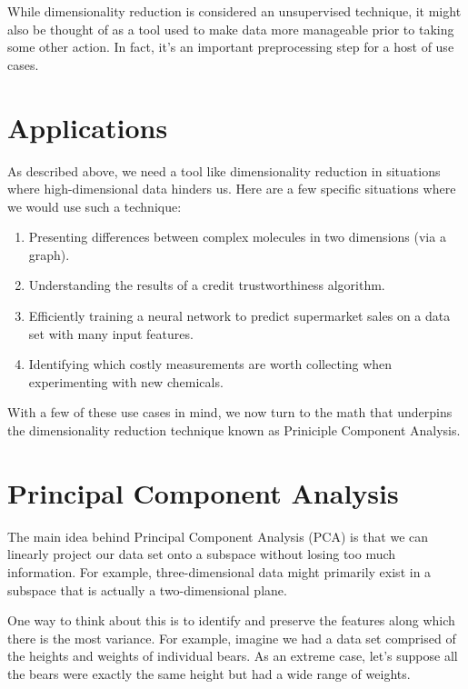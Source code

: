 While dimensionality reduction is considered an unsupervised technique, it might also be thought of as a tool used to make data more manageable prior to taking some other action. In fact, it's an important preprocessing step for a host of use cases.

\section{Applications}
As described above, we need a tool like dimensionality reduction in situations where high-dimensional data hinders us. Here are a few specific situations where we would use such a technique:

\begin{enumerate}
    \item Presenting differences between complex molecules in two dimensions (via a graph).
    \item Understanding the results of a credit trustworthiness algorithm.
    \item Efficiently training a neural network to predict supermarket sales on a data set with many input features.
    \item Identifying which costly measurements are worth collecting when experimenting with new chemicals.
\end{enumerate}

With a few of these use cases in mind, we now turn to the math that underpins the dimensionality reduction technique known as Priniciple Component Analysis.

\section{Principal Component Analysis}
The main idea behind Principal Component Analysis (PCA) is that we can linearly project our data set onto a subspace without losing too much information. For example, three-dimensional data might primarily exist in a subspace that is actually a two-dimensional plane.

One way to think about this is to identify and preserve the features along which there is the most variance. For example, imagine we had a data set comprised of the heights and weights of individual bears. As an extreme case, let's suppose all the bears were exactly the same height but had a wide range of weights.

